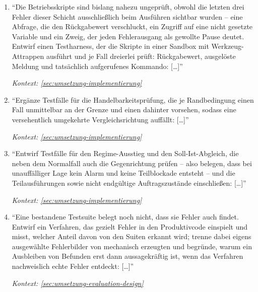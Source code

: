 \begin{enumerate}
    \item \enquote{Die Betriebsskripte sind bislang nahezu ungeprüft, obwohl
            die letzten drei Fehler dieser Schicht ausschließlich beim
            Ausführen sichtbar wurden -- eine Abfrage, die den Rückgabewert
            verschluckt, ein Zugriff auf eine nicht gesetzte Variable und ein
            Zweig, der jeden Fehlerausgang als gewollte Pause deutet. Entwirf
            einen Testharness, der die Skripte in einer Sandbox mit
            Werkzeug-Attrappen ausführt und je Fall dreierlei prüft:
            Rückgabewert, ausgelöste Meldung und tatsächlich aufgerufenes
            Kommando: [\dots]}
            \par\hfill\textit{Kontext:
            \cref{sec:umsetzung-implementierung}}

    \item \enquote{Ergänze Testfälle für die Handelbarkeitsprüfung, die je
            Randbedingung einen Fall unmittelbar an der Grenze und einen
            dahinter vorsehen, sodass eine versehentlich umgekehrte
            Vergleichsrichtung auffällt: [\dots]}
            \par\hfill\textit{Kontext:
            \cref{sec:umsetzung-implementierung}}

    \item \enquote{Entwirf Testfälle für den Regime-Ausstieg und den
            Soll-Ist-Abgleich, die neben dem Normalfall auch die
            Gegenrichtung prüfen -- also belegen, dass bei
            unauffälliger Lage kein Alarm und keine Teilblockade entsteht --
            und die Teilausführungen sowie nicht endgültige Auftragszustände
            einschließen: [\dots]}
            \par\hfill\textit{Kontext:
            \cref{sec:umsetzung-implementierung}}

    \item \enquote{Eine bestandene Testsuite belegt noch nicht, dass sie
            Fehler auch findet. Entwirf ein Verfahren, das gezielt Fehler in
            den Produktivcode einspielt und misst, welcher Anteil davon von
            den Suiten erkannt wird; trenne dabei eigens ausgewählte
            Fehlerbilder von mechanisch erzeugten und begründe, warum ein
            Ausbleiben von Befunden erst dann aussagekräftig ist, wenn das
            Verfahren nachweislich echte Fehler entdeckt: [\dots]}
            \par\hfill\textit{Kontext:
            \cref{sec:umsetzung-evaluation-design}}
\end{enumerate}


